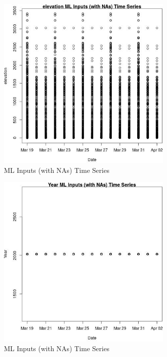 \begin{figure} 
\centering  
\includegraphics[width=0.77\textwidth]{Code_Outputs/Report_ML_input_PM25_Step4_part_e_de_duplicated_aveswNAs_elevationvDate.jpg} 
\caption{\label{fig:Report_ML_input_PM25_Step4_part_e_de_duplicated_aveswNAselevationvDate}ML Inputs (with NAs) Time Series} 
\end{figure} 
 

\begin{figure} 
\centering  
\includegraphics[width=0.77\textwidth]{Code_Outputs/Report_ML_input_PM25_Step4_part_e_de_duplicated_aveswNAs_YearvDate.jpg} 
\caption{\label{fig:Report_ML_input_PM25_Step4_part_e_de_duplicated_aveswNAsYearvDate}ML Inputs (with NAs) Time Series} 
\end{figure} 
 

